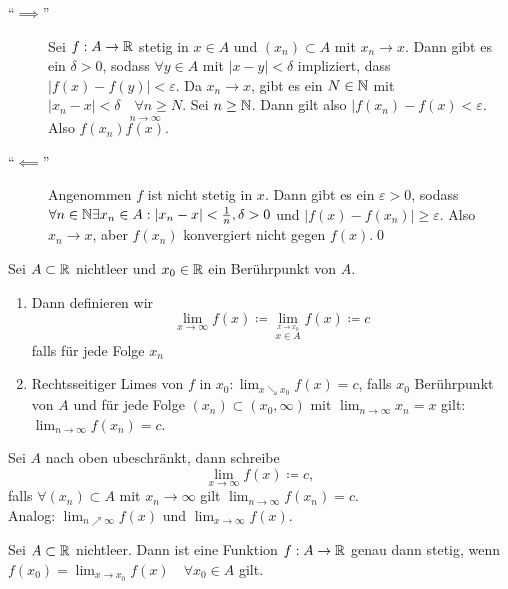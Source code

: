 \begin{subproof}[Theorem 7.3.1]
	\begin{description}
		\item[``$ \implies  $''] Sei $ f: A\to \mathbb{R}  $ stetig in $ x \in A $ und $ (x_n) \subset A $ mit $ x_n \to x $.
			Dann gibt es ein $ \delta > 0 $, sodass $ \forall y \in A $ mit $ |x - y| < \delta $ impliziert, dass $ |f(x) - f(y)| < \varepsilon  $.
			Da $ x_n \to x $, gibt es ein $ N \in \mathbb{N}  $ mit $ |x_n - x| < \delta \quad \forall n\geq N $.
			Sei $ n\geq \mathbb{N}  $. Dann gilt also $ |f(x_n) - f(x) < \varepsilon  $.
			Also $ f(x_n) \overset{n\to \infty}{f(x)} $.
		\item[``$ \impliedby  $''] Angenommen $ f $ ist nicht stetig in $ x $.
			Dann gibt es ein $ \varepsilon > 0 $, sodass $ \forall n \in \mathbb{N}  \exists x_n \in A : |x_n - x| < \frac{ 1 }{ n }, \delta > 0 $ und $ |f(x) - f(x_n)| \geq \varepsilon  $.
			Also $  x_n \to x $, aber $ f(x_n) $ konvergiert nicht gegen $ f(x) $.\qed
	\end{description}
\end{subproof}

\begin{subdefinition}
	Sei $ A\subset \mathbb{R} $ nichtleer und $ x_0 \in \mathbb{R}  $ ein Berührpunkt von $ A $.
	\begin{enumerate}[label=\arabic*.]
		\item Dann definieren wir
			\[
				\lim_{x \to \infty} f(x) \coloneqq \lim_{\overset{x\to x_0}{x \in A}} f(x) \coloneqq c
			\]
			falls für jede Folge $ x_n $
		\item Rechtsseitiger Limes von $ f $ in $ x_0: \lim_{x \searrow x_0} f(x) = c $, falls $ x_0 $ Berührpunkt von $ A  $ und für jede Folge $ (x_n) \subset (x_0, \infty) $ mit $ \lim_{n \to \infty} x_n = x $ gilt: $ \lim_{n \to \infty}  f(x_n) = c$.
	\end{enumerate}
	Sei $ A $ nach oben ubeschränkt, dann schreibe
	\[
		\lim_{x \to \infty} f(x) \coloneqq c,
	\]
	falls $ \forall (x_n) \subset A $ mit $ x_n \to \infty $ gilt $ \lim_{n \to \infty} f(x_n) = c $.\\
	Analog: $ \lim_{n \nearrow \infty} f(x) $ und $ \lim_{x \to \infty} f(x) $.
\end{subdefinition}

\begin{subcorollary}
	Sei $ A \subset \mathbb{R}  $ nichtleer. Dann ist eine Funktion $ f: A \to \mathbb{R}  $ genau dann stetig, wenn $ f(x_0) = \lim_{x \to x_0} f(x) \quad \forall x_0 \in A $ gilt.
\end{subcorollary}

